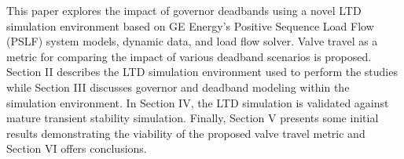 This paper explores the impact of governor deadbands using a novel LTD simulation environment based on GE Energy's Positive Sequence Load Flow (PSLF) system models, dynamic data, and load flow solver. 
Valve travel as a metric for comparing the impact of various deadband scenarios is proposed. 
Section II describes the LTD simulation environment used to perform the studies while
Section III discusses governor and deadband modeling within the simulation environment. 
In Section IV, the LTD simulation is validated against mature transient stability simulation. 
Finally, Section V presents some initial results demonstrating the viability of the proposed valve travel metric and Section VI offers conclusions.